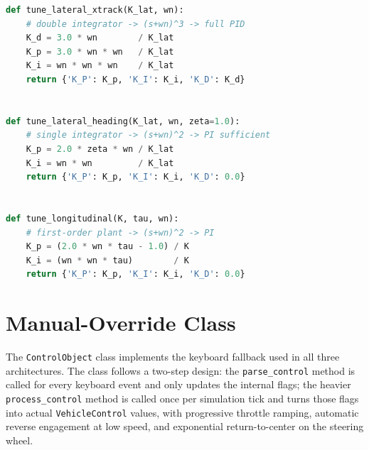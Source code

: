\begin{lstlisting}[language=Python]
def tune_lateral_xtrack(K_lat, wn):
    # double integrator -> (s+wn)^3 -> full PID
    K_d = 3.0 * wn        / K_lat
    K_p = 3.0 * wn * wn   / K_lat
    K_i = wn * wn * wn    / K_lat
    return {'K_P': K_p, 'K_I': K_i, 'K_D': K_d}


def tune_lateral_heading(K_lat, wn, zeta=1.0):
    # single integrator -> (s+wn)^2 -> PI sufficient
    K_p = 2.0 * zeta * wn / K_lat
    K_i = wn * wn         / K_lat
    return {'K_P': K_p, 'K_I': K_i, 'K_D': 0.0}


def tune_longitudinal(K, tau, wn):
    # first-order plant -> (s+wn)^2 -> PI
    K_p = (2.0 * wn * tau - 1.0) / K
    K_i = (wn * wn * tau)        / K
    return {'K_P': K_p, 'K_I': K_i, 'K_D': 0.0}
\end{lstlisting}

\section{Manual-Override Class}
The \texttt{ControlObject} class implements the keyboard fallback used in all three architectures. The class follows a two-step design: the \texttt{parse\_control} method is called for every keyboard event and only updates the internal flags; the heavier \texttt{process\_control} method is called once per simulation tick and turns those flags into actual \texttt{VehicleControl} values, with progressive throttle ramping, automatic reverse engagement at low speed, and exponential return-to-center on the steering wheel.

